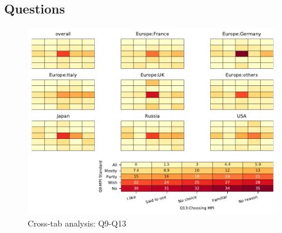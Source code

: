 
\subsection{Questions}


\begin{figure}
\begin{center}
\includegraphics[width=12cm]{../pdfs/Q9-Q13.pdf}
\caption{Cross-tab analysis: Q9-Q13}
\label{fig:Q9-Q13}
\end{center}
\end{figure}
